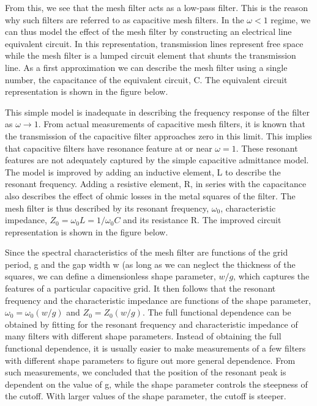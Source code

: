 \documentclass[12pt]{article}
\begin{document}
From this, we see that the mesh filter acts as a low-pass filter. This is the reason why such filters are referred to as capacitive mesh filters. In the $\omega < 1$ regime, we can thus model the effect of the mesh filter by constructing an electrical line equivalent circuit. In this representation, transmission lines represent free space while the mesh filter is a lumped circuit element that shunts the transmission line. As a first approximation we can describe the mesh filter using a single number, the capacitance of the equivalent circuit, C. The equivalent circuit representation is shown in the figure below. 

This simple model is inadequate in describing the frequency response of the filter as $\omega \rightarrow 1$. From actual measurements of capacitive mesh filters, it is known that the transmission of the capacitive filter approaches zero in this limit. This implies that capacitive filters have resonance feature at or near $\omega = 1$. These resonant features are not adequately captured by the simple capacitive admittance model. The model is improved by adding an inductive element, L to describe the resonant frequency. Adding a resistive element, R, in series with the capacitance also describes the effect of ohmic losses in the metal squares of the filter. The mesh filter is thus described by its resonant frequency, $\omega_0$, characteristic impedance, $Z_0 = \omega_0 L = 1/\omega_0 C$ and its resistance R. The improved circuit representation is shown in the figure below.

Since the spectral characteristics of the mesh filter are functions of the grid period, g and the gap width w (as long as we can neglect the thickness of the squares,  we can define a dimensionless shape parameter, $w/g$, which captures the features of a particular capacitive grid. It then follows that the resonant frequency and the characteristic impedance are functions of the shape parameter, $\omega_0 = \omega_0 (w/g)$ and $Z_0 = Z_0 (w/g)$. The full functional dependence can be obtained by fitting for the resonant frequency and characteristic impedance of many filters with different shape parameters. Instead of obtaining the full functional dependence, it is usually easier to make measurements of a few filters with different shape parameters to figure out more general dependence. From such measurements, we concluded that the position of the resonant peak is dependent on the value of g, while the shape parameter controls the steepness of the cutoff. With larger values of the shape parameter, the cutoff is steeper.
\end{document}
